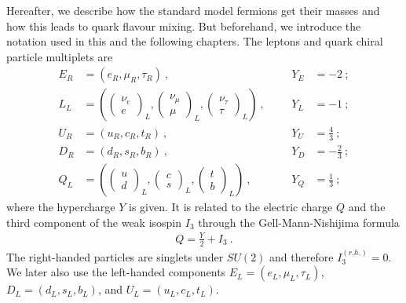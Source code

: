Hereafter, we describe how the standard model fermions get their masses and how this leads to quark flavour mixing. But beforehand, we introduce the notation used in this and the following chapters. The leptons and quark chiral particle multiplets are
\begin{align*}
	E_R &= (e_R,\mu_R,\tau_R) \ , && &Y_E &= -2 \ ; \\
	L_L &= \left(\begin{pmatrix} \nu_e \\ e \end{pmatrix}_L,
	\begin{pmatrix} \nu_\mu \\ \mu \end{pmatrix}_L,
	\begin{pmatrix} \nu_\tau \\ \tau \end{pmatrix}_L\right) \ , && &Y_L &= -1 \ ; \\
	U_R &= (u_R,c_R,t_R) \ , && &Y_U &= \frac{4}{3} \ ; \\
	D_R &= (d_R,s_R,b_R) \ , && &Y_D &= -\frac{2}{3} \ ; \\
	Q_L &= \left(\begin{pmatrix} u \\ d \end{pmatrix}_L,
	\begin{pmatrix} c \\ s \end{pmatrix}_L,
	\begin{pmatrix} t \\ b \end{pmatrix}_L\right) \ , && &Y_Q &= \frac{1}{3} \ ;
\end{align*}
where the hypercharge $Y$ is given. It is related to the electric charge $Q$ and the third component of the weak isospin $I_3$ through the Gell-Mann-Nishijima formula \cite[Chapter 10.7]{Griffiths}
\begin{align*}%
	Q = \frac{Y}{2} + I_3 \ .
\end{align*}
The right-handed particles are singlets under $SU(2)$ and therefore $I^{(r.h.)}_3=0$. We later also use the left-handed components $E_L = (e_L,\mu_L,\tau_L)$, $D_L = (d_L,s_L,b_L)$, and $U_L = (u_L,c_L,t_L)$.


